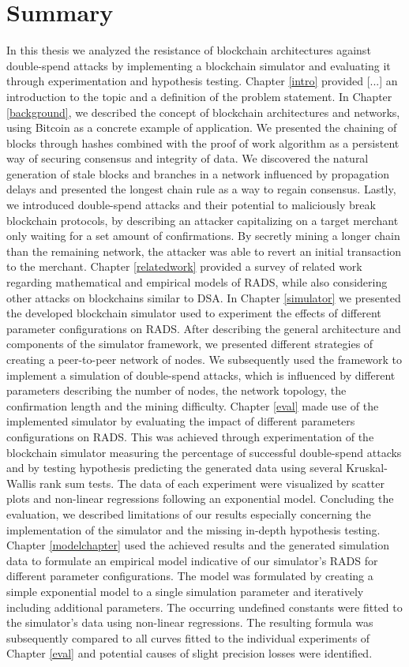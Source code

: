 \documentclass[a4paper,12pt,twoside]{report}
\begin{document}
\section{Summary}
In this thesis we analyzed the resistance of blockchain architectures against double-spend attacks by implementing a blockchain simulator and evaluating it through experimentation and hypothesis testing. Chapter \ref{intro} provided [...] an introduction to the topic and a definition of the problem statement. In Chapter \ref{background}, we described the concept of blockchain architectures and networks, using Bitcoin as a concrete example of application. We presented the chaining of blocks through hashes combined with the proof of work algorithm as a persistent way of securing consensus and integrity of data. We discovered the natural generation of stale blocks and branches in a network influenced by propagation delays and presented the longest chain rule as a way to regain consensus. Lastly, we introduced double-spend attacks and their potential to maliciously break blockchain protocols, by describing an attacker capitalizing on a target merchant only waiting for a set amount of confirmations. By secretly mining a longer chain than the remaining network, the attacker was able to revert an initial transaction to the merchant. Chapter \ref{relatedwork} provided a survey of related work regarding mathematical and empirical models of RADS, while also considering other attacks on blockchains similar to DSA. In Chapter \ref{simulator} we presented the developed blockchain simulator used to experiment the effects of different parameter configurations on RADS. After describing the general architecture and components of the simulator framework, we presented different strategies of creating a peer-to-peer network of nodes. We subsequently used the framework to implement a simulation of double-spend attacks, which is influenced by different parameters describing the number of nodes, the network topology, the confirmation length and the mining difficulty. Chapter \ref{eval} made use of the implemented simulator by evaluating the impact of different parameters configurations on RADS. This was achieved through experimentation of the blockchain simulator measuring the percentage of successful double-spend attacks and by testing hypothesis predicting the generated data using several Kruskal-Wallis rank sum tests. The data of each experiment were visualized by scatter plots and non-linear regressions following an exponential model. Concluding the evaluation, we described limitations of our results especially concerning the implementation of the simulator and the missing in-depth hypothesis testing. Chapter \ref{modelchapter} used the achieved results and the generated simulation data to formulate an empirical model indicative of our simulator's RADS for different parameter configurations. The model was formulated by creating a simple exponential model to a single simulation parameter and iteratively including additional parameters. The occurring undefined constants were fitted to the simulator's data using non-linear regressions. The resulting formula was subsequently compared to all curves fitted to the individual experiments of Chapter \ref{eval} and potential causes of slight precision losses were identified.
\end{document}
